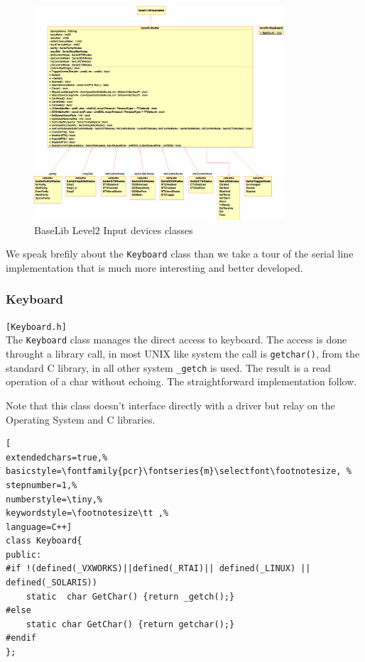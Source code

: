 \begin{figure}[h!]
 \begin{center}
  \includegraphics[width=0.83\textwidth]{level2/level2-Input.eps}
  \caption{BaseLib Level2 Input devices classes}
  \label{f:level2:Input}
 \end{center}
\end{figure}

We speak brefily about the \texttt{Keyboard} class than we take a tour of the serial line implementation that is much more interesting and better developed.



\subsubsection{Keyboard}
\texttt{[Keyboard.h]}\\
The \texttt{Keyboard} class manages the direct access to keyboard. The access is done throught a library call, in most UNIX like system the call is \texttt{getchar()}, from the standard C library, in all other system \texttt{\_getch} is used. The result is a read operation of a char without echoing. The straightforward implementation follow.

Note that this class doesn't interface directly with a driver but relay on the Operating System and C libraries.
\begin{lstlisting}[
extendedchars=true,%
basicstyle=\fontfamily{pcr}\fontseries{m}\selectfont\footnotesize, %
stepnumber=1,%
numberstyle=\tiny,%
keywordstyle=\footnotesize\tt ,%
language=C++]
class Keyboard{
public:
#if !(defined(_VXWORKS)||defined(_RTAI)|| defined(_LINUX) || defined(_SOLARIS))
    static  char GetChar() {return _getch();}
#else
    static char GetChar() {return getchar();}
#endif
};
\end{lstlisting}



